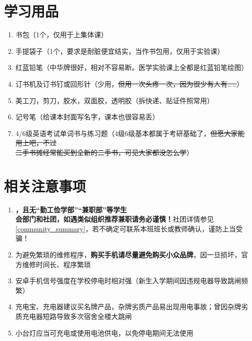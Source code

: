 \section[学习用品]{学习用品}
\begin{enumerate}
    \item 书包（1个，仅用于上集体课）
    \item 手提袋子（1个，要求是耐脏便宜结实，当作书包用，仅用于实验课）
    \item 红蓝铅笔（中华牌很好，相对不容易断。医学实验课上全都是红蓝铅笔绘图）
    \item 订书机及订书钉或回形针（少用，\sout{但用一次头疼一次，因为很少有人有……}）
    \item 美工刀，剪刀，胶水，双面胶，透明胶（拆快递、贴证件照常用）
    \item 记号笔（给课本封面写名字，课本也很容易丢）
    \item 4/6级英语考试单词书与练习题（4级6级基本都属于考研基础了，\sout{但愿大家能用上吧，不过\\二手书摊经常能买到全新的二手书，可见大家都没怎么学}）
\end{enumerate}

\section[相关注意事项]{相关注意事项}
\begin{enumerate}
    \item \textbf{，且无“勤工俭学部”“兼职部”等学生\\会部门和社团，如遇类似组织推荐兼职请务必谨慎！}社团详情参见\uline{\ref{community_summary}}，若不确定可联系本班班长或教师确认，谨防上当受骗！
    \item 为避免繁琐的维修程序，\textbf{购买手机请尽量避免购买小众品牌}，因一旦损坏，官方维修时间长、程序繁琐
    \item 安卓手机信号强度在学校停电时相对强（新生入学期间因违规电器导致跳闸频繁）
    \item 充电宝、充电器建议买名牌产品，杂牌劣质产品易出现用电事故；曾因杂牌劣质充电器短路导致多次宿舍全楼大跳闸
    \item 小台灯应当可充电或使用电池供电，以免停电期间无法使用
\end{enumerate}